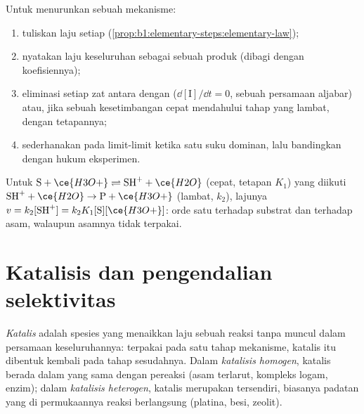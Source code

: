 \begin{method}\label{met:b1:elementary-steps:rate-law}
Untuk menurunkan  sebuah mekanisme:
\begin{enumerate}
  \item tuliskan laju setiap  (\cref{prop:b1:elementary-steps:elementary-law});
  \item nyatakan laju keseluruhan sebagai  sebuah produk
        (dibagi dengan koefisiennya);
  \item eliminasi setiap zat antara dengan 
        ($\dd[\mathrm{I}]/\dd t = 0$, sebuah persamaan aljabar) atau, jika
        sebuah kesetimbangan cepat mendahului tahap yang lambat, dengan
        tetapannya;
  \item sederhanakan pada limit-limit ketika satu suku dominan, lalu
        bandingkan dengan hukum eksperimen.
\end{enumerate}
\end{method}

\begin{example}\label{ex:b1:elementary-steps:acid}
Untuk $\mathrm{S} + \ce{H3O+} \rightleftharpoons \mathrm{SH}^+ + \ce{H2O}$ (cepat,
tetapan $K_1$) yang diikuti $\mathrm{SH}^+ + \ce{H2O} \to \mathrm{P} + \ce{H3O+}$ (lambat,
$k_2$), lajunya $v = k_2[\mathrm{SH}^+] = k_2K_1[\mathrm{S}][\ce{H3O+}]$:
orde satu terhadap substrat dan terhadap asam, walaupun asamnya tidak
terpakai.
\end{example}

\section{Katalisis dan pengendalian selektivitas}

\begin{definition}\label{def:b1:elementary-steps:catalyst}
\emph{Katalis} adalah spesies yang menaikkan laju sebuah
reaksi tanpa muncul dalam persamaan keseluruhannya: terpakai pada satu
tahap mekanisme, katalis itu dibentuk kembali pada tahap sesudahnya.
Dalam \emph{katalisis homogen}, katalis berada
dalam  yang sama dengan pereaksi (asam terlarut, kompleks logam,
enzim); dalam \emph{katalisis heterogen},
katalis merupakan  tersendiri, biasanya padatan yang di permukaannya
reaksi berlangsung (platina, besi, zeolit).
\end{definition}

